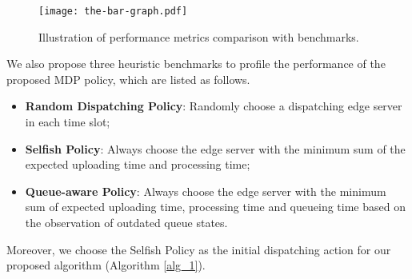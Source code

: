 
\begin{figure}[ht]                                                      %
    \centering                                                          %
    \texttt{[image: the-bar-graph.pdf]}               %
    \caption{Illustration of performance metrics comparison with benchmarks.}
    \label{fig:bar_plot}                                                %
\end{figure}                                                            %

We also propose {three heuristic benchmarks to profile the performance of the proposed MDP policy}, which are listed as follows.
\begin{itemize}
    \item \textbf{Random Dispatching Policy}:
            Randomly choose a dispatching edge server in each time slot; 
    \item \textbf{Selfish Policy}:
            Always choose the edge server with the minimum sum of the expected uploading time and processing time;
    \item \textbf{Queue-aware Policy}:
            Always choose the edge server with the minimum sum of expected uploading time, processing time and queueing time based on the observation of outdated queue states.
\end{itemize}
Moreover, we choose the Selfish Policy as the initial dispatching action for our proposed algorithm (Algorithm \ref{alg_1}).

